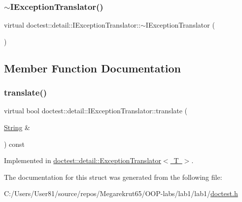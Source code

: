 \mbox{\label{structdoctest_1_1detail_1_1_i_exception_translator_a9031aa45964213709841eba4b3e19d48}} 
\subsubsection{\texorpdfstring{$\sim$\+I\+Exception\+Translator()}{~IExceptionTranslator()}}
{\footnotesize\ttfamily virtual doctest\+::detail\+::\+I\+Exception\+Translator\+::$\sim$\+I\+Exception\+Translator (\begin{DoxyParamCaption}{ }\end{DoxyParamCaption})\hspace{0.3cm}{\ttfamily [virtual]}}



\subsection{Member Function Documentation}
\mbox{\label{structdoctest_1_1detail_1_1_i_exception_translator_a9c56005e4c83c13b859cc2e31102bfbc}} 
\subsubsection{\texorpdfstring{translate()}{translate()}}
{\footnotesize\ttfamily virtual bool doctest\+::detail\+::\+I\+Exception\+Translator\+::translate (\begin{DoxyParamCaption}\item[{\mbox{\hyperlink{classdoctest_1_1_string}{String}} \&}]{ }\end{DoxyParamCaption}) const\hspace{0.3cm}{\ttfamily [pure virtual]}}



Implemented in \mbox{\hyperlink{classdoctest_1_1detail_1_1_exception_translator_a56484c4218a06bbbd1548335a8b64110}{doctest\+::detail\+::\+Exception\+Translator$<$ T $>$}}.



The documentation for this struct was generated from the following file\+:\begin{DoxyCompactItemize}
\item 
C\+:/\+Users/\+User81/source/repos/\+Megarekrut65/\+O\+O\+P-\/labs/lab1/lab1/\mbox{\hyperlink{doctest_8h}{doctest.\+h}}\end{DoxyCompactItemize}
